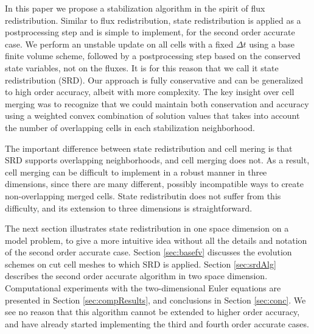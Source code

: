 In this paper we propose a stabilization algorithm in
the spirit of flux redistribution. Similar to flux redistribution, state
redistribution is applied as a postprocessing step and is simple to implement,
for the second order accurate case. We perform an unstable update on all 
cells with a fixed $\Delta t$ using a base finite volume scheme, followed
by a postprocessing step based on the conserved state variables, not on the
fluxes.  It is for this reason that we call it state redistribution
(SRD).  Our
approach is fully conservative and can be generalized to high order accuracy,
albeit with  more complexity. The key insight over cell merging was to
recognize that we could maintain both conservation and accuracy using a
weighted convex combination of solution values that takes into account the 
number of overlapping cells in each stabilization neighborhood.

The important difference between state redistribution and cell mering is
that SRD supports overlapping neighborhoods, and cell merging does not.
As a result, cell merging can be difficult to implement in a robust
manner in three dimensions, since there are many different, possibly
incompatible ways to create non-overlapping merged cells.  State
redistributin does not suffer from this difficulty, and its extension to
three dimensions is straightforward.

The next section illustrates state redistribution  in one space dimension
on a model problem, to give a more intuitive idea without all the details and 
notation of the second order accurate  case.
Section \ref{sec:basefv} discusses the evolution schemes on cut cell meshes
to which SRD is applied.
Section \ref{sec:srdAlg} describes the second order accurate
algorithm in two space dimension.  Computational experiments with the
two-dimensional Euler equations  are presented in
Section \ref{sec:compResults}, and conclusions in Section \ref{sec:conc}. 
We see no reason that this algorithm cannot be extended to higher order
accuracy, and have already started implementing the third and fourth
order accurate cases.

